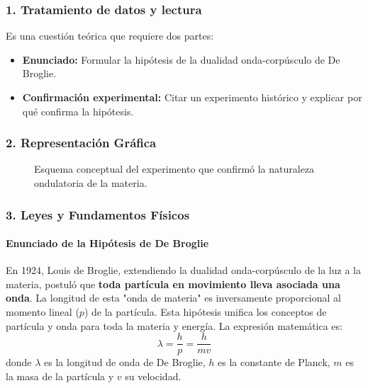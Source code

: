 \subsubsection*{1. Tratamiento de datos y lectura}
Es una cuestión teórica que requiere dos partes:
\begin{itemize}
    \item \textbf{Enunciado:} Formular la hipótesis de la dualidad onda-corpúsculo de De Broglie.
    \item \textbf{Confirmación experimental:} Citar un experimento histórico y explicar por qué confirma la hipótesis.
\end{itemize}

\subsubsection*{2. Representación Gráfica}
\begin{figure}[H]
    \centering
    \caption{Esquema conceptual del experimento que confirmó la naturaleza ondulatoria de la materia.}
\end{figure}

\subsubsection*{3. Leyes y Fundamentos Físicos}
\paragraph{Enunciado de la Hipótesis de De Broglie}
En 1924, Louis de Broglie, extendiendo la dualidad onda-corpúsculo de la luz a la materia, postuló que \textbf{toda partícula en movimiento lleva asociada una onda}. La longitud de esta "onda de materia" es inversamente proporcional al momento lineal ($p$) de la partícula. Esta hipótesis unifica los conceptos de partícula y onda para toda la materia y energía.
La expresión matemática es:
$$ \lambda = \frac{h}{p} = \frac{h}{mv} $$
donde $\lambda$ es la longitud de onda de De Broglie, $h$ es la constante de Planck, $m$ es la masa de la partícula y $v$ su velocidad.

